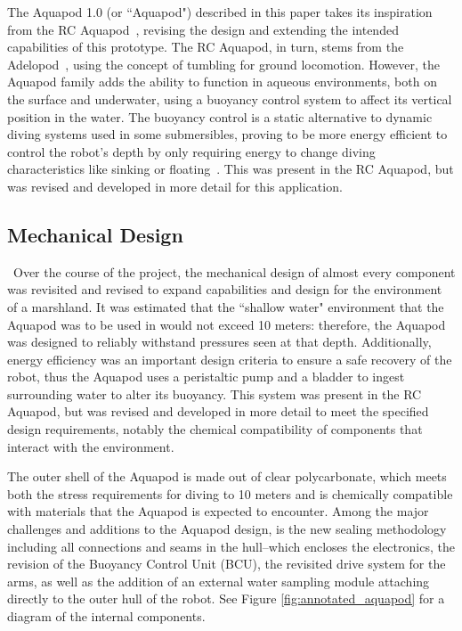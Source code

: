 The Aquapod 1.0 (or ``Aquapod") described in this paper takes its inspiration from the RC Aquapod~\cite{Carlson2011}, revising the design and extending the intended capabilities of this prototype.  The RC Aquapod, in turn, stems from the Adelopod~\cite{Hemes2011}, using the concept of tumbling for ground locomotion.  However, the Aquapod family adds the ability to function in aqueous environments, both on the surface and underwater, using a buoyancy control system to affect its vertical position in the water.  The buoyancy control is a static alternative to dynamic diving systems used in some submersibles, proving to be more energy efficient to control the robot's depth by only requiring energy to change diving characteristics like sinking or floating~\cite{Detweiler2009}.  This was present in the RC Aquapod, but was revised and developed in more detail for this application.
 

\subsection{ Mechanical Design}\
Over the course of the project, the mechanical design of almost every component was revisited and revised to expand capabilities and design for the environment of a marshland.  It was estimated that the ``shallow water" environment that the Aquapod was to be used in would not exceed 10 meters: therefore, the Aquapod was designed to reliably withstand pressures seen at that depth.  Additionally, energy efficiency was an important design criteria to ensure a safe recovery of the robot, thus the Aquapod uses a peristaltic pump and a bladder to ingest surrounding water to alter its buoyancy.  This system was present in the RC Aquapod, but was revised and developed in more detail to meet the specified design requirements, notably the chemical compatibility of components that interact with the environment.  

The outer shell of the Aquapod is made out of clear polycarbonate, which meets both the stress requirements for diving to 10 meters and is chemically compatible with materials that the Aquapod is expected to encounter.  Among the major challenges and additions to the Aquapod design, is the new sealing methodology including all connections and seams in the hull--which encloses the electronics, the revision of the Buoyancy Control Unit (BCU), the revisited drive system for the arms, as well as the addition of an external water sampling module attaching directly to the outer hull of the robot. See Figure \ref{fig:annotated_aquapod} for a diagram of the internal components.

